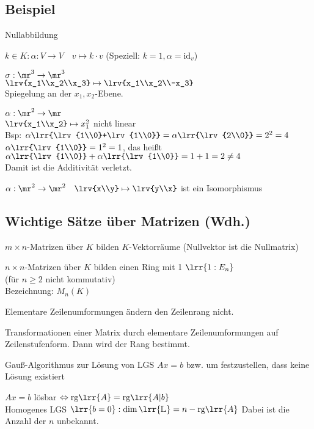 \subsection{Beispiel}
		\item Nullabbildung
		\item $k\in K:\alpha:V\rightarrow V\quad v\mapsto k\cdot v$ (Speziell: $k=1,\alpha =\mbox{id}_v$)
		\item $\sigma:\mr^3\rightarrow\mr^3$\\
			$\lrv{x_1\\x_2\\x_3}\mapsto\lrv{x_1\\x_2\\-x_3}$\\
			Spiegelung an der $x_1,x_2$-Ebene.
		\item $\alpha:\mr^2\rightarrow\mr$\\
			$\lrv{x_1\\x_2}\mapsto x_1^2$ nicht linear\\
			Bsp: $\alpha\lrr{\lrv{1\\0}+\lrv{1\\0}}=\alpha\lrr{\lrv{2\\0}}=2^2=4$\\
			$\alpha\lrr{\lrv{1\\0}}=1^2=1$, das heißt $\alpha\lrr{\lrv{1\\0}}+\alpha\lrr{\lrv{1\\0}}=1+1=2\neq 4$\\
			Damit ist die Additivität verletzt.
		\item $\alpha:\mr^2\rightarrow\mr^2\quad \lrv{x\\y}\mapsto\lrv{y\\x}$ ist ein Isomorphismus
	\subExEnd
	
\subsection{Wichtige Sätze über Matrizen (Wdh.)}
		\item $m\times n$-Matrizen über $K$ bilden $K$-Vektorräume (Nullvektor ist die Nullmatrix)
		\item $n\times n$-Matrizen über $K$ bilden einen Ring mit 1 $\lrr{1:E_n}$\\
			(für $n\geq 2$ nicht kommutativ)\\
			Bezeichnung: $M_n(K)$
		\item Elementare Zeilenumformungen ändern den Zeilenrang nicht.
		\item Transformationen einer Matrix durch elementare Zeilenumformungen auf Zeilenstufenform. Dann wird der Rang bestimmt.
		\item Gauß-Algorithmus zur Lösung von LGS $Ax=b$ bzw. um festzustellen, dass keine Lösung existiert
		\item $Ax=b$ lösbar $\Leftrightarrow\mbox{rg}\lrr{A}=\mbox{rg}\lrr{A|b}$\\
			Homogenes LGS $\lrr{b=0}:\dim\lrr{\mathbb{L}}=n-\mbox{rg}\lrr{A}$ Dabei ist die Anzahl der $n$ unbekannt.
	\subExEnd
	
